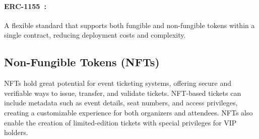 \paragraph{ERC-1155~\cite{erc1155}:}
A flexible standard that supports both fungible and non-fungible tokens within
a single contract, reducing deployment costs and complexity.

\subsection{Non-Fungible Tokens (NFTs)}\label{subsec:nfts}

NFTs hold great potential for event ticketing systems, offering secure and
verifiable ways to issue, transfer, and validate tickets. NFT-based tickets can
include metadata such as event details, seat numbers, and access privileges,
creating a customizable experience for both organizers and attendees. NFTs also
enable the creation of limited-edition tickets with special privileges for VIP
holders.
